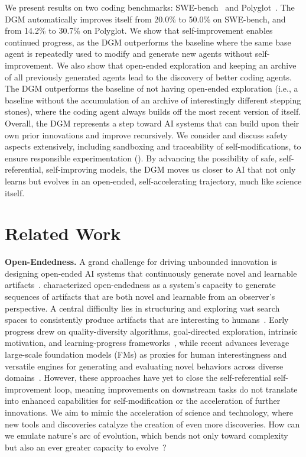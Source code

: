 \documentclass{article} %
\begin{document}
We present results on two coding benchmarks: SWE-bench~\citep{jimenez2024swebench} and Polyglot~\citep{gauthier2024polyglot}. The DGM automatically improves itself from 20.0\% to 50.0\% on SWE-bench, and from 14.2\% to 30.7\% on Polyglot. We show that self-improvement enables continued progress, as the DGM outperforms the baseline where the same base agent is repeatedly used to modify and generate new agents without self-improvement. We also show that open-ended exploration and keeping an archive of all previously generated agents lead to the discovery of better coding agents. The DGM outperforms the baseline of not having open-ended exploration (i.e., a baseline without the accumulation of an archive of interestingly different stepping stones), where the coding agent always builds off the most recent version of itself. Overall, the DGM represents a step toward AI systems that can build upon their own prior innovations and improve recursively. We consider and discuss safety aspects extensively, including sandboxing and traceability of self-modifications, to ensure responsible experimentation (). By advancing the possibility of safe, self-referential, self-improving models, the DGM moves us closer to AI that not only learns but evolves in an open-ended, self-accelerating trajectory, much like science itself.

\section{Related Work}
\label{sec:related}

\textbf{Open-Endedness.}
A grand challenge for driving unbounded innovation is designing open-ended AI systems that continuously generate novel and learnable artifacts~\citep{stanley2017open}. \citet{hughes2024open} characterized open-endedness as a system's capacity to generate sequences of artifacts that are both novel and learnable from an observer's perspective. A central difficulty lies in structuring and exploring vast search spaces to consistently produce artifacts that are interesting to humans~\citep{clune2019ai, jiang2023general}. Early progress drew on quality-diversity algorithms, goal-directed exploration, intrinsic motivation, and learning-progress frameworks~\citep{pugh2016quality, ecoffet2019go, lehman2011novelty, oudeyer2007intrinsic}, while recent advances leverage large-scale foundation models (FMs) as proxies for human interestingness and versatile engines for generating and evaluating novel behaviors across diverse domains~\citep{brown2020language, hu2025automated, zhang2024omni}. However, these approaches have yet to close the self-referential self-improvement loop, meaning improvements on downstream tasks do not translate into enhanced capabilities for self-modification or the acceleration of further innovations. We aim to mimic the acceleration of science and technology, where new tools and discoveries catalyze the creation of even more discoveries. How can we emulate nature's arc of evolution, which bends not only toward complexity but also an ever greater capacity to evolve~\citep{dawkins2019evolution, gerhart2007theory, hendrikse2007evolvability}?
\end{document}
